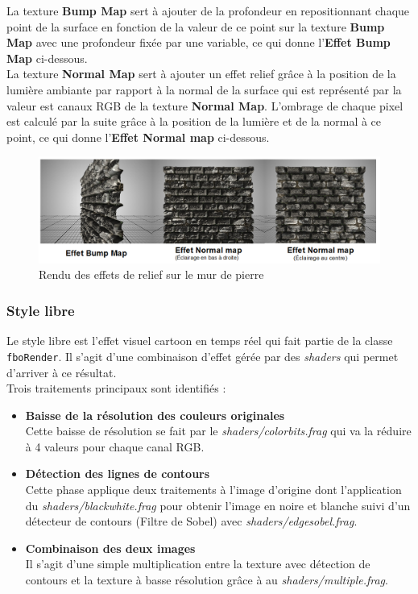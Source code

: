 La texture \textbf{Bump Map} sert à ajouter de la profondeur en repositionnant chaque point de la surface en fonction de la valeur de ce point sur la texture \textbf{Bump Map} avec une profondeur fixée par une variable, ce qui donne l'\textbf{Effet Bump Map} ci-dessous. \\

La texture \textbf{Normal Map} sert à ajouter un effet relief grâce à la position de la lumière ambiante par rapport à la normal de la surface qui est représenté par la valeur est canaux RGB de la texture \textbf{Normal Map}. L'ombrage de chaque pixel est calculé par la suite grâce à la position de la lumière et de la normal à ce point, ce qui donne l'\textbf{Effet Normal map} ci-dessous.

\begin{figure}[H]
    \centering
	\includegraphics[scale=0.62]{img/infog-image-rendu-mur-pierre.png}
	\caption{Rendu des effets de relief sur le mur de pierre}
	\label{fig:wallnormalbumprender}
\end{figure}

\subsubsection{Style libre}

Le style libre est l'effet visuel cartoon en temps réel qui fait partie de la classe \texttt{fboRender}. Il s'agit d'une combinaison d'effet gérée par des \textit{shaders} qui permet d'arriver à ce résultat. \\

Trois traitements principaux sont identifiés :
\begin{itemize}
\item \textbf{Baisse de la résolution des couleurs originales}\\
Cette baisse de résolution se fait par le \textit{shaders/colorbits.frag} qui va la réduire à 4 valeurs pour chaque canal RGB.
\item \textbf{Détection des lignes de contours}\\
Cette phase applique deux traitements à l'image d'origine dont l'application du \textit{shaders/blackwhite.frag} pour obtenir l'image en noire et blanche suivi d'un détecteur de contours (Filtre de Sobel) avec \textit{shaders/edgesobel.frag}.
\item \textbf{Combinaison des deux images}\\
Il s'agit d'une simple multiplication entre la texture avec détection de contours et la texture à basse résolution grâce à au \textit{shaders/multiple.frag}. \\
\end{itemize}

